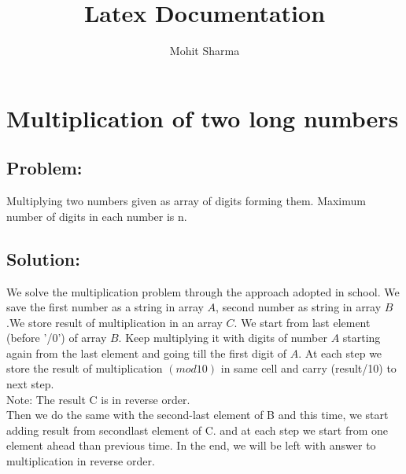 \documentclass[11pt]{article}
\begin{document}
\author{Mohit Sharma}
\title{Latex Documentation}
\maketitle

\section{Multiplication of two long numbers}

\subsection{Problem:}
 Multiplying two numbers given as array of digits forming them. Maximum number of digits 
 in each number is n. \\

\subsection{ Solution: }
We solve the multiplication problem through the approach adopted in school. We save the first number as a string in array $A$, second number as string in array $B$.We store result of multiplication in an array $C$. We start from last element (before '/0') of array $B$. Keep multiplying it with digits of number $A$ starting again from the last element and going till the first digit of $A$. At each step we store the result of multiplication $(mod 10)$ in same cell and carry  (result/10) to next step.\\


{Note:} The result C is in reverse order.\\
Then we do the same with the second-last element of B and this time, we start adding result from secondlast element of C. and at each step we start from one element ahead than previous time.
In the end, we will be left with answer to multiplication in reverse order.\\\\
\end{document}
